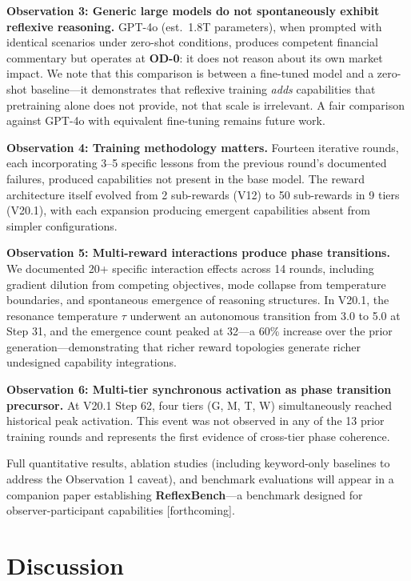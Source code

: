 \documentclass[11pt,a4paper]{article}
\begin{document}
\textbf{Observation 3: Generic large models do not spontaneously exhibit reflexive reasoning.} GPT-4o (est.\ 1.8T parameters), when prompted with identical scenarios under zero-shot conditions, produces competent financial commentary but operates at \textbf{OD-0}: it does not reason about its own market impact. We note that this comparison is between a fine-tuned model and a zero-shot baseline---it demonstrates that reflexive training \textit{adds} capabilities that pretraining alone does not provide, not that scale is irrelevant. A fair comparison against GPT-4o with equivalent fine-tuning remains future work.

\textbf{Observation 4: Training methodology matters.} Fourteen iterative rounds, each incorporating 3--5 specific lessons from the previous round's documented failures, produced capabilities not present in the base model. The reward architecture itself evolved from 2 sub-rewards (V12) to 50 sub-rewards in 9 tiers (V20.1), with each expansion producing emergent capabilities absent from simpler configurations.

\textbf{Observation 5: Multi-reward interactions produce phase transitions.} We documented 20+ specific interaction effects across 14 rounds, including gradient dilution from competing objectives, mode collapse from temperature boundaries, and spontaneous emergence of reasoning structures. In V20.1, the resonance temperature $\tau$ underwent an autonomous transition from 3.0 to 5.0 at Step 31, and the emergence count peaked at 32---a 60\% increase over the prior generation---demonstrating that richer reward topologies generate richer undesigned capability integrations.

\textbf{Observation 6: Multi-tier synchronous activation as phase transition precursor.} At V20.1 Step 62, four tiers (G, M, T, W) simultaneously reached historical peak activation. This event was not observed in any of the 13 prior training rounds and represents the first evidence of cross-tier phase coherence.

Full quantitative results, ablation studies (including keyword-only baselines to address the Observation 1 caveat), and benchmark evaluations will appear in a companion paper establishing \textbf{ReflexBench}---a benchmark designed for observer-participant capabilities [forthcoming].

\section{Discussion}
\end{document}
